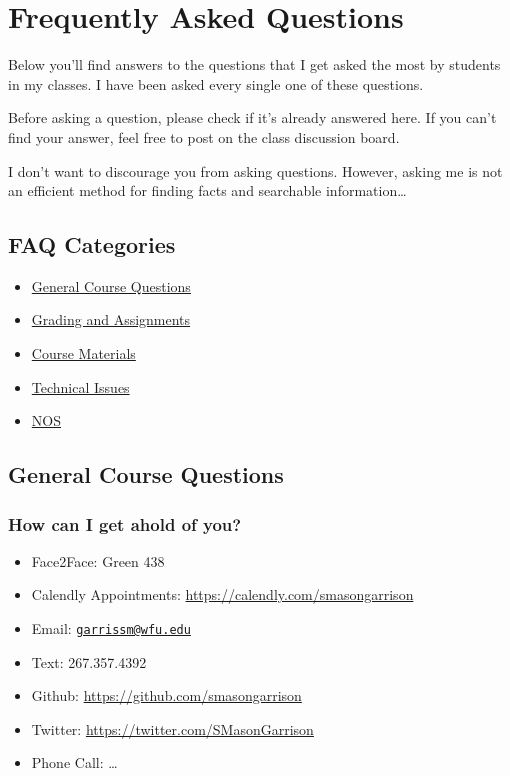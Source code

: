 \documentclass[
]{book}
\providecommand{\tightlist}{%
  \setlength{\itemsep}{0pt}\setlength{\parskip}{0pt}}
\begin{document}
\chapter{Frequently Asked Questions}\label{frequently-asked-questions}

Below you'll find answers to the questions that I get asked the most by students in my classes. I have been asked every single one of these questions.

Before asking a question, please check if it's already answered here. If you can't find your answer, feel free to post on the class discussion board.

I don't want to discourage you from asking questions. However, asking me is not an efficient method for finding facts and searchable information\ldots{}

\section*{FAQ Categories}\label{faq-categories}


\begin{itemize}
\tightlist
\item
  \hyperref[general]{General Course Questions}
\item
  \hyperref[grading]{Grading and Assignments}
\item
  \hyperref[materials]{Course Materials}
\item
  \hyperref[tech]{Technical Issues}
\item
  \hyperref[nos]{NOS}
\end{itemize}

\section{General Course Questions}\label{general}

\subsection{How can I get ahold of you?}\label{how-can-i-get-ahold-of-you}

\begin{itemize}
\item
  Face2Face: Green 438
\item
  Calendly Appointments: \url{https://calendly.com/smasongarrison}
\item
  Email: \href{mailto:garrissm@wfu.edu}{\nolinkurl{garrissm@wfu.edu}}
\item
  Text: 267.357.4392
\item
  Github: \url{https://github.com/smasongarrison}
\item
  Twitter: \url{https://twitter.com/SMasonGarrison}
\item
  Phone Call: \ldots{}
\end{itemize}
\end{document}
